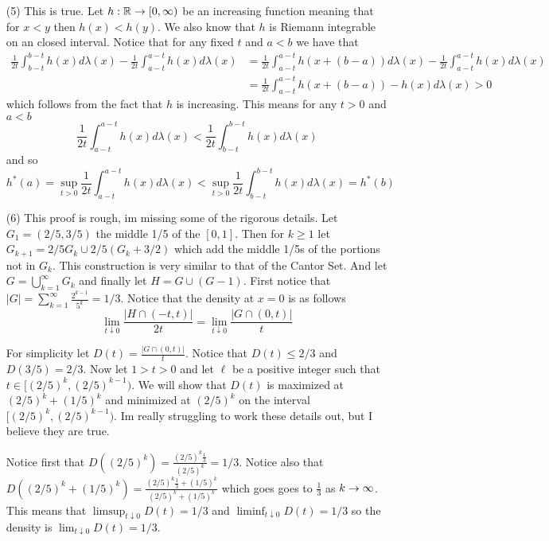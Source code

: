 \documentclass[12pt]{amsart}
\begin{document}
\begin{itemize}
   \item[(5)] This is true. Let $h:\mathbb{R}\rightarrow[0,\infty)$ be an increasing function meaning 
   that for $x<y$ then $h(x)<h(y)$. We also know that $h$ is Riemann integrable 
   on an closed interval. Notice that for any fixed $t$ and $a<b$ we have that
   \begin{align*}
      \frac{1}{2t}\int_{b-t}^{b-t}h(x)d\lambda(x)-\frac{1}{2t}\int_{a-t}^{a-t}h(x)d\lambda(x)&=
   \frac{1}{2t}\int_{a-t}^{a-t}h(x+(b-a))d\lambda(x)-\frac{1}{2t}\int_{a-t}^{a-t}h(x)d\lambda(x)
   \\&= \frac{1}{2t}\int_{a-t}^{a-t}h(x+(b-a))-h(x)d\lambda(x)>0
   \end{align*}
   which follows from the fact that $h$ is increasing. This means for any $t>0$ and $a<b$
   \[\frac{1}{2t}\int_{a-t}^{a-t}h(x)d\lambda(x)<\frac{1}{2t}\int_{b-t}^{b-t}h(x)d\lambda(x)\]
   and so 
   \[h^*(a)=\sup_{t>0}\frac{1}{2t}\int_{a-t}^{a-t}h(x)d\lambda(x)<\sup_{t>0}\frac{1}{2t}\int_{b-t}^{b-t}h(x)d\lambda(x)=h^*(b)\]

   \item[(6)] This proof is rough, im missing some of the rigorous details.
   Let $G_1=(2/5,3/5)$ the middle 1/5 of the $[0,1]$. Then for $k\geq 1$ let $G_{k+1}=2/5G_k\cup 2/5(G_k+3/2)$ 
   which add the middle 1/5s of the portions not in $G_k$. This construction is very similar to that of the Cantor Set.
   And let $G=\bigcup_{k=1}^{\infty}G_k$ and finally let $H=G\cup(G-1)$.
   First notice that $|G|=\sum_{k=1}^\infty\frac{2^{k-1}}{5^k}=1/3$.
   Notice that the density at $x=0$ is as follows
   \[\lim_{t\downarrow 0}\frac{|H\cap (-t,t)|}{2t}=\lim_{t\downarrow 0}\frac{|G\cap (0,t)|}{t}\]
   
   For simplicity let $D(t)=\frac{|G\cap (0,t)|}{t}$. Notice that $D(t)\leq 2/3$ and $D(3/5)=2/3$. %
   Now let $1>t>0$ and let $\ell$ be a positive integer such that $t\in[(2/5)^k,(2/5)^{k-1})$.
   We will show that $D(t)$ is maximized at $(2/5)^k+(1/5)^k$ and minimized at $(2/5)^k$ on the interval $[(2/5)^k,(2/5)^{k-1})$.
   Im really struggling to work these details out, but I believe they are true.


   Notice first that $D((2/5)^k)=\frac{(2/5)^k\frac{1}{3}}{(2/5)^k}=1/3$.
   Notice also that $D((2/5)^k+(1/5)^k)=\frac{(2/5)^k\frac{1}{3}+(1/5)^k}{(2/5)^k+(1/5)^k}$ 
   which goes goes to $\frac{1}{3}$ as $k\rightarrow\infty$.
   This means that $\limsup_{t\downarrow 0}D(t)=1/3$ and $\liminf_{t\downarrow 0}D(t)=1/3$ 
   so the density is $\lim_{t\downarrow 0}D(t)=1/3$.
   
\end{itemize}
\end{document}

